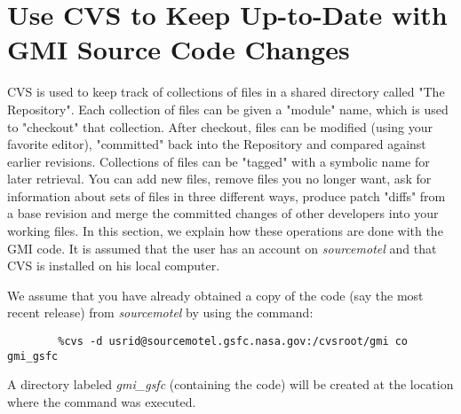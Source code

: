 \section{Use CVS to Keep Up-to-Date with GMI Source Code Changes}
%
CVS is used to keep track of collections of files in a shared directory called 
"The Repository". 
Each collection of files can be given a "module" name, which is used to "checkout" 
that collection.
%
After checkout, files can be modified (using your favorite editor), "committed" back 
into the Repository and compared against earlier revisions. 
Collections of files can be "tagged" with a symbolic name for later retrieval.
%
You can add new files, remove files you no longer want, ask for information about sets 
of files in three different ways, produce patch "diffs" from a base revision and merge 
the committed changes of other developers into your working files.
%
In this section, we explain how these operations are done with the GMI code.
It is assumed that the user has an account on {\em sourcemotel} and that CVS is
installed on his local computer.

We assume that you have already obtained a copy of the code (say the most recent
release) from {\em sourcemotel} by using the command:
%
\begin{verbatim}
        %cvs -d usrid@sourcemotel.gsfc.nasa.gov:/cvsroot/gmi co gmi_gsfc
\end{verbatim}
%
A directory labeled {\em gmi\_gsfc} (containing the code) will be created at the 
location where the command was executed.

